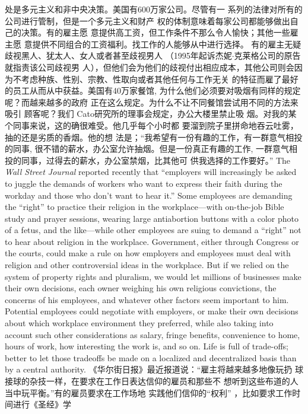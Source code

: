 \begin{paracol}{2}
处是多元主义和非中央决策。美国有600万家公司。尽管有一
系列的法律对所有的公司进行管制，但是一个多元主义和财产
权的体制意味着每家公司都能够做出自己的决策。有的雇主愿
意提供高工资，但工作条件不那么令人愉快；其他一些雇主愿
意提供不同组合的工资福利。找工作的人能够从中进行选择。
有的雇主无疑歧视黑人、犹太人、女人或者甚至歧视男人
（1995年起诉杰妮$\cdot$克莱格公司的原告就指责该公司歧视男
人），但他们会为他们的歧视付出相应成本，其他公司则会因
为不考虑种族、性别、宗教、性取向或者其他任何与工作无关
的特征而雇了最好的员工从而从中获益。美国有40万家餐馆,
为什么他们必须要对吸烟有同样的规定呢？而越来越多的政府
正在这么规定。为什么不让不同餐馆尝试用不同的方法来吸引
顾客呢？我们 Cato研究所的理事会规定，办公大楼里禁止吸
烟。对我的某个同事来说，这的确很难受。他几乎每个小时都
要溜到院子里拼命地吞云吐雾，抽的还是劣质的香烟。他的想
法是；“我希望有一份有趣的工作，有一群意气相投的同事,
很不错的薪水，办公室允许抽烟。但是一份真正有趣的工作,
一群意气相投的同事，过得去的薪水，办公室禁烟，比其他可
供我选择的工作要好。”
\switchcolumn*
The \textit{Wall Street Journal }reported recently that ``employers will
increasingly be asked to juggle the demands of workers who
want to express their faith during the workday and those who
don't want to hear it.'' Some employees are demanding the
``right'' to practice their religion in the workplace---with on-the-job Bible study and prayer sessions, wearing large antiabortion buttons with a color photo of a fetus, and the like---while
other employees are suing to demand a ``right'' not to hear
about religion in the workplace. Government, either through
Congress or the courts, could make a rule on how employers
and employees must deal with religion and other controversial
ideas in the workplace. But if we relied on the system of property rights and pluralism, we would let millions of businesses
make their own decisions, each owner weighing his own religious convictions, the concerns of his employees, and whatever
other factors seem important to him. Potential employees could
negotiate with employers, or make their own decisions about
which workplace environment they preferred, while also taking
into account such other considerations as salary, fringe benefits,
convenience to home, hours of work, how interesting the work
is, and so on. Life is full of trade-offs; better to let those tradeoffs be made on a localized and decentralized basis than by a
central authority.
\switchcolumn
《华尔街日报》最近报道说：“雇主将越来越多地像玩扔
球接球的杂技一样，在要求在工作日表达信仰的雇员和那些不
想听到这些布道的人当中玩平衡。”有的雇员要求在工作场地
实践他们信仰的“权利” ，比如要求工作时间进行《圣经》学

\end{paracol}
